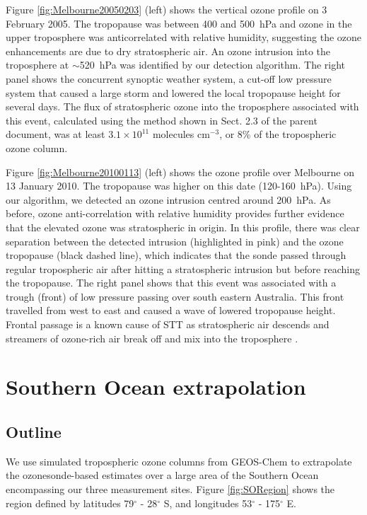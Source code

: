     Figure \ref{fig:Melbourne20050203} (left) shows the vertical ozone profile on 3 February 2005.
    The tropopause was between 400 and 500~hPa and ozone in the upper troposphere was anticorrelated with relative humidity, suggesting the ozone enhancements are due to dry stratospheric air. 
    An ozone intrusion into the troposphere at $\sim$520~hPa was identified by our detection algorithm.
    The right panel shows the concurrent synoptic weather system, a cut-off low pressure system that caused a large storm and lowered the local tropopause height for several days.
    The flux of stratospheric ozone into the troposphere associated with this event, calculated using the method shown in Sect. 2.3 of the parent document, was at least $3.1 \times 10^{11}$ molecules cm$^{-3}$, or 8\% of the tropospheric ozone column.
    
    Figure \ref{fig:Melbourne20100113} (left) shows the ozone profile over Melbourne on 13 January 2010.
    The tropopause was higher on this date (120-160~hPa).
    Using our algorithm, we detected an ozone intrusion centred around 200~hPa.
    As before, ozone anti-correlation with relative humidity provides further evidence that the elevated ozone was stratospheric in origin.
    In this profile, there was clear separation between the detected intrusion (highlighted in pink) and the ozone tropopause (black dashed line), which indicates that the sonde passed through regular tropospheric air after hitting a stratospheric intrusion but before reaching the tropopause.
    The right panel shows that this event was associated with a trough (front) of low pressure passing over south eastern Australia.
    This front travelled from west to east and caused a wave of lowered tropopause height. 
    Frontal passage is a known cause of STT as stratospheric air descends and streamers of ozone-rich air break off and mix into the troposphere \citep{Sprenger2003}.
    
\section{Southern Ocean extrapolation}
  \label{sec:SOExtrapolation}

  \subsection{Outline}
    We use simulated tropospheric ozone columns from GEOS-Chem to extrapolate the ozonesonde-based estimates over a large area of the Southern Ocean encompassing our three measurement sites. 
    Figure \ref{fig:SORegion} shows the region defined by latitudes 79$^{\circ}$ - 28$^{\circ}$ S, and longitudes 53$^{\circ}$ - 175$^{\circ}$ E.
    
